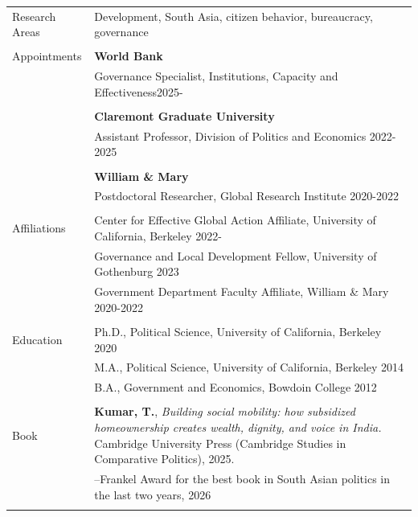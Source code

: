 \documentclass[letterpaper, 10.5pt]{article}
\begin{document}
\begin{longtable}{p{1.5in}p{5in}}

Research Areas & Development, South Asia,  citizen behavior, bureaucracy,  governance \\
& \\
Appointments 
& \textbf{World Bank} \hfill  \\
& Governance Specialist, Institutions, Capacity and Effectiveness\hfill  2025-\\& \\
& \textbf{Claremont Graduate University} \hfill  \\
& Assistant Professor, Division of Politics and Economics \hfill  2022-2025\\

& \\

& \textbf{William \& Mary} \hfill \\
& Postdoctoral Researcher, Global Research Institute \hfill 2020-2022 \\


& \\

Affiliations & Center for Effective Global Action Affiliate, University of California,  Berkeley \hfill 2022-\\ 
& Governance and Local Development Fellow, University of Gothenburg \hfill 2023\\


& Government Department Faculty Affiliate, William \& Mary \hfill 2020-2022  \\
& \\
{Education} 
&Ph.D., Political Science, University of California, Berkeley \hfill 2020 \\


& M.A., Political Science, University of California, Berkeley \hfill 2014 \\
& B.A., Government and Economics, Bowdoin College  \hfill 2012 \\

& \\

Book & \textbf{Kumar, T.},  \textit{Building social mobility: how subsidized homeownership creates wealth, dignity, and voice in India.}  Cambridge University Press (Cambridge Studies in Comparative Politics), 2025.\\
&--\indent  Frankel Award for the best book in South Asian politics in the last two years, 2026\\
& \\


\end{longtable}
\end{document}
